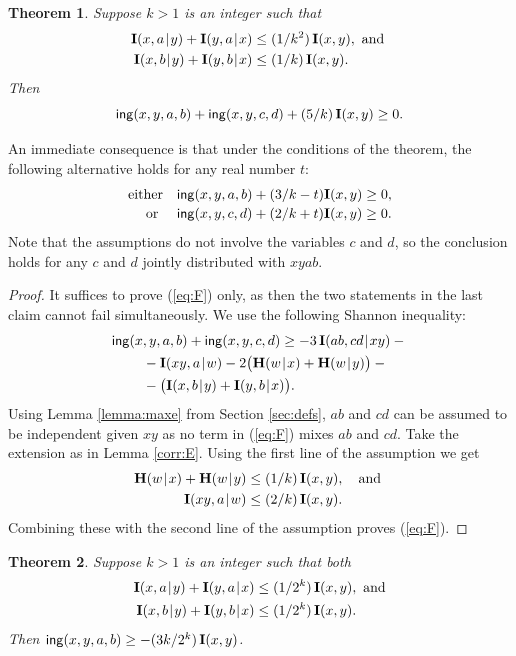 \documentclass[10pt,a4paper]{amsart}
\def\|{\mskip1.5mu{|}\mskip1.5mu}
\def\H{\mathbf H}
\def\I{\mathbf I}
\def\ing[#1,#2,#3,#4]{\mathsf{ing}(#1,#2,#3,#4\mkern 0mu)}
\newtheorem{theorem}{Theorem}
\begin{document}
\begin{theorem}\label{thm:F}
Suppose $k>1$ is an integer such that
\begin{align*}
  \I(x,a\|y)+\I(y,a\|x) &\le (1/k^2)\,\I(x,y), \mbox{ and }\\
  \I(x,b\|y)+\I(y,b\|x) &\le (1/k)\,\I(x,y).
\end{align*}
Then
\begin{equation}\label{eq:F}
   \ing[x,y,a,b]+\ing[x,y,c,d]+ (5/k)\,\I(x,y) \ge 0.
\end{equation}
\end{theorem}

An immediate consequence is that under the conditions of the theorem, the
following alternative holds for any real number $t$:
$$\begin{array}{rl}
   \mbox{\emph{either}} & \ing[x,y,a,b] + (3/k-t)\I(x,y)\ge 0,\\[2pt]
   \mbox{\emph{or} }    & \ing[x,y,c,d] + (2/k+t)\I(x,y)\ge 0.
\end{array}$$
Note that the assumptions do not involve the variables $c$ and $d$, so the
conclusion holds for any $c$ and $d$ jointly distributed with $xyab$.

\begin{proof}
It suffices to prove (\ref{eq:F}) only, as then the two statements
in the last claim cannot fail simultaneously. We use the following Shannon
inequality:
\begin{align*}
  & \ing[x,y,a,b] + \ing[x,y,c,d] \ge -3\,\I(ab,cd\|xy) - {} \\
  & \mkern 40mu {}-\I(xy,a\|w)-2\big(\H(w\|x)+\H(w\|y)\big) - {} \\
  & \mkern 40mu {}-\big(\I(x,b\|y)+\I(y,b\|x)\big).
\end{align*}
Using Lemma \ref{lemma:maxe} from Section \ref{sec:defs}, $ab$ and $cd$ can be
assumed to be independent given $xy$ as no term in (\ref{eq:F}) mixes $ab$
and $cd$. Take the extension as in Lemma \ref{corr:E}. Using the first line
of the assumption we get
\begin{align*}
\H(w\|x)+\H(w\|y)&\le (1/k)\,\I(x,y), ~~\mbox{ and }\\
       \I(xy,a\|w)&\le (2/k)\,\I(x,y).
\end{align*}
Combining these with the second line of the assumption proves (\ref{eq:F}).
\end{proof}

\begin{theorem}\label{thm:C}
Suppose $k>1$ is an integer such that both
\begin{align*}
  \I(x,a\|y)+\I(y,a\|x) &\le (1/2^k)\,\I(x,y), \mbox{ and}\\
  \I(x,b\|y)+\I(y,b\|x) &\le (1/2^k)\,\I(x,y).
\end{align*}
Then $\ing[x,y,a,b]\ge -(3k/2^k)\,\I(x,y)$.
\end{theorem}
\end{document}
